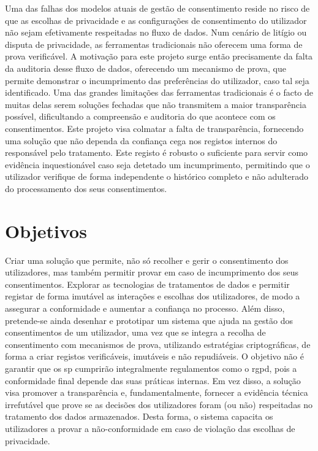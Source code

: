 Uma das falhas dos modelos atuais de gestão de consentimento reside no risco de que as escolhas de privacidade e as configurações de consentimento do utilizador não sejam efetivamente respeitadas no fluxo de dados. Num cenário de litígio ou disputa de privacidade, as ferramentas tradicionais não oferecem uma forma de prova verificável.
A motivação para este projeto surge então precisamente da falta da auditoria desse fluxo de dados, oferecendo um mecanismo de prova, que permite demonstrar o incumprimento das preferências do utilizador, caso tal seja identificado.
Uma das grandes limitações das ferramentas tradicionais é o facto de muitas delas serem soluções fechadas que não transmitem a maior transparência possível, dificultando a compreensão e auditoria do que acontece com os consentimentos.
Este projeto visa colmatar a falta de transparência, fornecendo uma solução que não dependa da confiança cega nos registos internos do responsável pelo tratamento. Este registo é robusto o suficiente para servir como evidência inquestionável caso seja detetado um incumprimento, permitindo que o utilizador verifique de forma independente o histórico completo e não adulterado do processamento dos seus consentimentos.

\section{Objetivos}

Criar uma solução que permite, não só recolher e gerir o consentimento dos utilizadores, mas também permitir provar em caso de incumprimento dos seus consentimentos.
Explorar as tecnologias de tratamentos de dados e permitir registar de forma imutável as interações e escolhas dos utilizadores, de modo a assegurar a conformidade e aumentar a confiança no processo.
Além disso, pretende-se ainda desenhar e prototipar um sistema que ajuda na gestão dos consentimentos de um utilizador, uma vez que se integra a recolha de consentimento com mecanismos de prova, utilizando estratégias criptográficas, de forma a criar registos verificáveis, imutáveis e não repudiáveis.
O objetivo não é garantir que os \acrfull{sp} cumprirão integralmente regulamentos como o \acrshort{rgpd}, pois a conformidade final depende das suas práticas internas. Em vez disso, a solução visa promover a transparência e, fundamentalmente, fornecer a evidência técnica irrefutável que prove se as decisões dos utilizadores foram (ou não) respeitadas no tratamento dos dados armazenados.
Desta forma, o sistema capacita os utilizadores a provar a não-conformidade em caso de violação das escolhas de privacidade.

